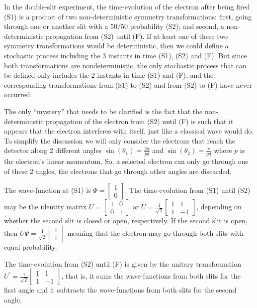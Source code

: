 \documentclass[11pt]{book}
\begin{document}
In the double-slit experiment, the time-evolution of the electron after
being fired (S1) is a product of two non-deterministic symmetry
transformations: first, going through one or another slit with a 50/50
probability (S2); and second, a non-deterministic propagation from (S2)
until (F). If at least one of these two symmetry transformations would
be deterministic, then we could define a stochastic process including
the 3 instants in time (S1), (S2) and (F). But since both
transformations are nondeterministic, the only stochastic process that
can be defined only includes the 2 instants in time (S1) and (F), and
the corresponding transformations from (S1) to (S2) and from (S2) to (F)
have never occurred.

The only ``mystery'' that needs to be clarified is the fact that the
non-deterministic propagation of the electron from (S2) until (F) is
such that it appears that the electron interferes with itself, just like
a classical wave would do. To simplify the discussion we will only
consider the electrons that reach the detector along 2 different angles
\(\sin(\theta_1)=\frac{2 \pi}{p d}\) and
\(\sin(\theta_2)=\frac{\pi}{p d}\) where \(p\) is the electron's linear
momentum. So, a selected electron can only go through one of these 2
angles, the electrons that go through other angles are discarded.

The wave-function at (S1) is
\(\Psi=\left[\begin{smallmatrix} 1 \\ 0\end{smallmatrix}\right]\). The
time-evolution from (S1) until (S2) may be the identity matrix
\(U=\left[\begin{smallmatrix} 1 & 0 \\ 0 & 1 \end{smallmatrix}\right]\)
or
\(U=\frac{1}{\sqrt{2}}\left[\begin{smallmatrix} 1 & 1 \\ 1 & -1 \end{smallmatrix}\right]\),
depending on whether the second slit is closed or open, respectively. If
the second slit is open, then
\(U\Psi=\frac{1}{\sqrt{2}}\left[\begin{smallmatrix} 1 \\ 1 \end{smallmatrix}\right]\)
meaning that the electron may go through both slits with equal
probability.

The time-evolution from (S2) until (F) is given by the unitary
transformation
\(U^{'}=\frac{1}{\sqrt{2}}\left[\begin{smallmatrix} 1 & 1 \\ 1 & -1 \end{smallmatrix}\right]\),
that is, it sums the wave-functions from both slits for the first angle
and it subtracts the wave-functions from both slits for the second
angle.
\end{document}
